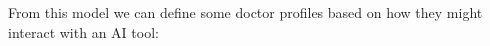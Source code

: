 \documentclass[manuscript,screen,review]{acmart}
\begin{document}















From this model we can define some doctor profiles based on how they might interact with an AI tool:
\end{document}
